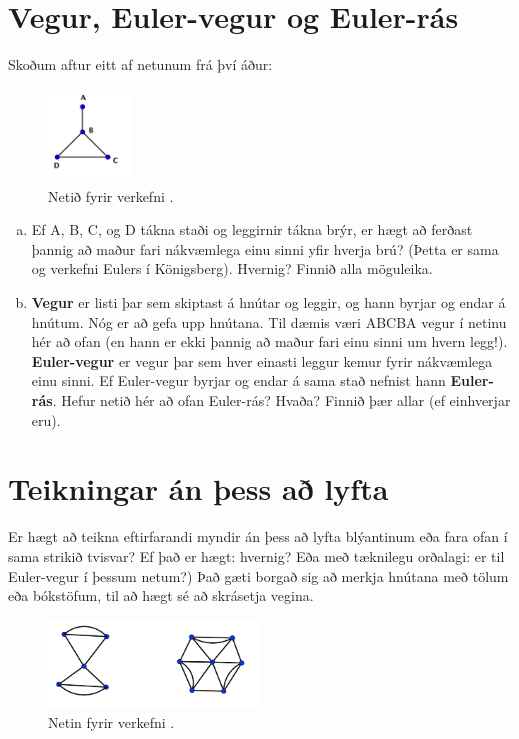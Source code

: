 \documentclass[b5paper,12pt]{book}
\renewcommand*\thesection{\arabic{section}}
\begin{document}
\section{Vegur, Euler-vegur og Euler-rás}
Skoðum aftur eitt af netunum frá því áður:

\begin{figure}[h]
  \includegraphics[width=0.2\textwidth, center]{einfaltnet.png}
  \caption*{Netið fyrir verkefni \thesection{}.}
\end{figure}

\begin{enumerate}[(a)]
\item Ef A, B, C, og D tákna staði og leggirnir tákna brýr, er hægt að ferðast þannig að maður fari nákvæmlega einu sinni yfir hverja brú? (Þetta er sama og verkefni Eulers í Königsberg). Hvernig? Finnið alla möguleika.
\item \textbf{Vegur} er listi þar sem skiptast á hnútar og leggir, og hann byrjar og endar á hnútum. Nóg er að gefa upp hnútana. Til dæmis væri ABCBA vegur í netinu hér að ofan (en hann er ekki þannig að maður fari einu sinni um hvern legg!). \textbf{Euler-vegur} er vegur þar sem hver einasti leggur kemur fyrir nákvæmlega einu sinni. Ef Euler-vegur byrjar og endar á sama stað nefnist hann \textbf{Euler-rás}. 
Hefur netið hér að ofan Euler-rás? Hvaða? Finnið þær allar (ef einhverjar eru).
\end{enumerate}

\section{Teikningar án þess að lyfta}
Er hægt að teikna eftirfarandi myndir án þess að lyfta blýantinum eða fara ofan í sama strikið tvisvar? Ef það er hægt: hvernig? Eða með tæknilegu orðalagi: er til Euler-vegur í þessum netum?) Það gæti borgað sig að merkja hnútana með tölum eða bókstöfum, til að hægt sé að skrásetja vegina.

\begin{figure}[h]
  \includegraphics[width=0.5\textwidth, center]{Eulerspurning1.png}
  \caption*{Netin fyrir verkefni \thesection{}.}
\end{figure}
\end{document}
